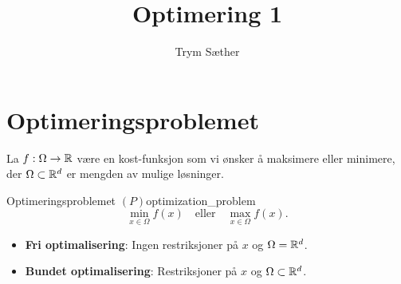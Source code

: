 \documentclass[10pt, a4paper]{report}
\begin{document}
\title{Optimering 1}

\author{Trym Sæther}

\maketitle

\tableofcontents

\newpage

\chapter*{Optimeringsproblemet}
La \(f: \Omega \to \mathbb{R}\) være en kost-funksjon som vi ønsker å maksimere eller minimere, der \(\Omega \subset \mathbb{R}^d\) er mengden av mulige løsninger.

\begin{definition}{Optimeringsproblemet \((P)\)}{optimization_problem}
  \[
    \min_{x \in \Omega} f(x) \quad \text{eller} \quad \max_{x \in \Omega} f(x).
  \]

\end{definition}


\begin{itemize}
  \item \textbf{Fri optimalisering}: Ingen restriksjoner på \(x\) og \(\Omega = \mathbb{R}^d\).
  \item \textbf{Bundet optimalisering}: Restriksjoner på \(x\) og \(\Omega \subset \mathbb{R}^d\).
\end{itemize}





\clearpage




\end{document}
